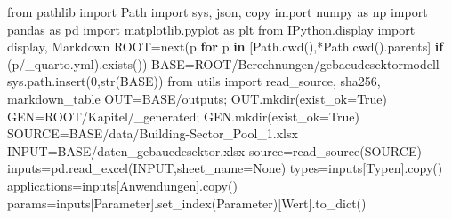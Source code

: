 \documentclass[
  ngerman,
  a4paper,
  DIV=11]{scrreprt}
\newenvironment{Shaded}{\begin{snugshade}}{\end{snugshade}}
\newcommand{\BuiltInTok}[1]{\textcolor[rgb]{0.00,0.23,0.31}{#1}}
\newcommand{\ControlFlowTok}[1]{\textcolor[rgb]{0.00,0.23,0.31}{\textbf{#1}}}
\newcommand{\DecValTok}[1]{\textcolor[rgb]{0.68,0.00,0.00}{#1}}
\newcommand{\ImportTok}[1]{\textcolor[rgb]{0.00,0.46,0.62}{#1}}
\newcommand{\KeywordTok}[1]{\textcolor[rgb]{0.00,0.23,0.31}{\textbf{#1}}}
\newcommand{\NormalTok}[1]{\textcolor[rgb]{0.00,0.23,0.31}{#1}}
\newcommand{\OperatorTok}[1]{\textcolor[rgb]{0.37,0.37,0.37}{#1}}
\newcommand{\StringTok}[1]{\textcolor[rgb]{0.13,0.47,0.30}{#1}}
\newcommand{\VariableTok}[1]{\textcolor[rgb]{0.07,0.07,0.07}{#1}}
\begin{document}
\begin{Shaded}
\begin{Highlighting}[]
\ImportTok{from}\NormalTok{ pathlib }\ImportTok{import}\NormalTok{ Path}
\ImportTok{import}\NormalTok{ sys, json, copy}
\ImportTok{import}\NormalTok{ numpy }\ImportTok{as}\NormalTok{ np}
\ImportTok{import}\NormalTok{ pandas }\ImportTok{as}\NormalTok{ pd}
\ImportTok{import}\NormalTok{ matplotlib.pyplot }\ImportTok{as}\NormalTok{ plt}
\ImportTok{from}\NormalTok{ IPython.display }\ImportTok{import}\NormalTok{ display, Markdown}
\NormalTok{ROOT}\OperatorTok{=}\BuiltInTok{next}\NormalTok{(p }\ControlFlowTok{for}\NormalTok{ p }\KeywordTok{in}\NormalTok{ [Path.cwd(),}\OperatorTok{*}\NormalTok{Path.cwd().parents] }\ControlFlowTok{if}\NormalTok{ (p}\OperatorTok{/}\StringTok{\textquotesingle{}\_quarto.yml\textquotesingle{}}\NormalTok{).exists())}
\NormalTok{BASE}\OperatorTok{=}\NormalTok{ROOT}\OperatorTok{/}\StringTok{\textquotesingle{}Berechnungen/gebaeudesektormodell\textquotesingle{}}
\NormalTok{sys.path.insert(}\DecValTok{0}\NormalTok{,}\BuiltInTok{str}\NormalTok{(BASE))}
\ImportTok{from}\NormalTok{ utils }\ImportTok{import}\NormalTok{ read\_source, sha256, markdown\_table}
\NormalTok{OUT}\OperatorTok{=}\NormalTok{BASE}\OperatorTok{/}\StringTok{\textquotesingle{}outputs\textquotesingle{}}\OperatorTok{;}\NormalTok{ OUT.mkdir(exist\_ok}\OperatorTok{=}\VariableTok{True}\NormalTok{)}
\NormalTok{GEN}\OperatorTok{=}\NormalTok{ROOT}\OperatorTok{/}\StringTok{\textquotesingle{}Kapitel/\_generated\textquotesingle{}}\OperatorTok{;}\NormalTok{ GEN.mkdir(exist\_ok}\OperatorTok{=}\VariableTok{True}\NormalTok{)}
\NormalTok{SOURCE}\OperatorTok{=}\NormalTok{BASE}\OperatorTok{/}\StringTok{\textquotesingle{}data/Building{-}Sector\_Pool\_1.xlsx\textquotesingle{}}
\NormalTok{INPUT}\OperatorTok{=}\NormalTok{BASE}\OperatorTok{/}\StringTok{\textquotesingle{}daten\_gebauedesektor.xlsx\textquotesingle{}}
\NormalTok{source}\OperatorTok{=}\NormalTok{read\_source(SOURCE)}
\NormalTok{inputs}\OperatorTok{=}\NormalTok{pd.read\_excel(INPUT,sheet\_name}\OperatorTok{=}\VariableTok{None}\NormalTok{)}
\NormalTok{types}\OperatorTok{=}\NormalTok{inputs[}\StringTok{\textquotesingle{}Typen\textquotesingle{}}\NormalTok{].copy()}
\NormalTok{applications}\OperatorTok{=}\NormalTok{inputs[}\StringTok{\textquotesingle{}Anwendungen\textquotesingle{}}\NormalTok{].copy()}
\NormalTok{params}\OperatorTok{=}\NormalTok{inputs[}\StringTok{\textquotesingle{}Parameter\textquotesingle{}}\NormalTok{].set\_index(}\StringTok{\textquotesingle{}Parameter\textquotesingle{}}\NormalTok{)[}\StringTok{\textquotesingle{}Wert\textquotesingle{}}\NormalTok{].to\_dict()}

\end{Highlighting}
\end{Shaded}
\end{document}
